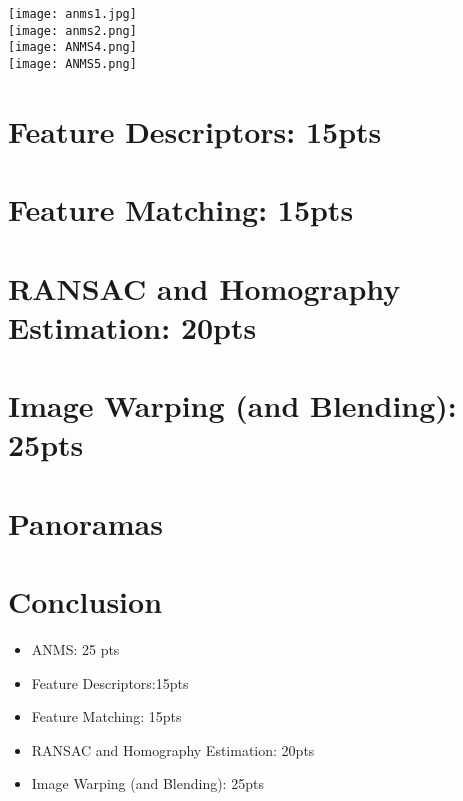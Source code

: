 \documentclass{article}
\begin{document}
\texttt{[image: anms1.jpg]}\\
\texttt{[image: anms2.png]}\\
\texttt{[image: ANMS4.png]}\\
\texttt{[image: ANMS5.png]}

\section{Feature Descriptors: 15pts}

\section{Feature Matching: 15pts}

\section{RANSAC and Homography Estimation: 20pts}
 
 
 
\section{Image Warping (and Blending): 25pts}

\section{Panoramas}


\section{Conclusion}




\begin{itemize}

    \item ANMS: 25 pts
    \item Feature Descriptors:15pts
    \item Feature Matching: 15pts
    \item RANSAC and Homography Estimation: 20pts
    \item Image Warping (and Blending): 25pts

\end{itemize}
\end{document}
